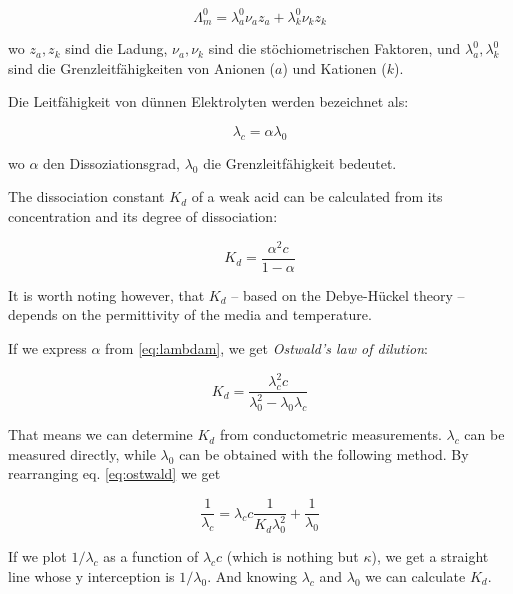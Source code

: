 
\begin{equation}
\label{eq:kohlrausch2}
	\Lambda _m^0
	=
	\lambda _a^0 \nu _a z_a + \lambda _k^0 \nu _k z_k
\end{equation}

wo $z_a, z_k$ sind die Ladung, $\nu _a, \nu _k$ sind die stöchiometrischen Faktoren, und $\lambda _a^0, \lambda _k^0$ sind die Grenzleitfähigkeiten von Anionen ($a$) und Kationen ($k$).

Die Leitfähigkeit von dünnen Elektrolyten werden bezeichnet als:

\begin{equation}
\label{eq:lambdam}
        \lambda_c
        =
        \alpha
	\lambda_0
\end{equation}

wo $\alpha$ den Dissoziationsgrad, $\lambda _0$ die Grenzleitfähigkeit bedeutet.

The dissociation constant $K_d$ of a weak acid can be calculated from its concentration and its degree of dissociation:

\begin{equation}
\label{eq:kd}
        K_d
        =
        \frac{\alpha^2 c}{1-\alpha}
\end{equation}

It is worth noting however, that $K_d$ -- based on the Debye-Hückel theory -- depends on the permittivity of the media and temperature.

If we express $\alpha$ from \ref{eq:lambdam}, we get \emph{Ostwald's law of dilution}:

\begin{equation}
\label{eq:ostwald}
        K_d
        =
        \frac{\lambda_c^2 c}{\lambda_0^2 - \lambda_0\lambda_c}
\end{equation}

That means we can determine $K_d$ from conductometric measurements. $\lambda_c$ can be measured directly, while $\lambda_0$ can be obtained with the following method. By rearranging eq. \ref{eq:ostwald} we get

\begin{equation}
\label{eq:ostwald2}
        \frac{1}{\lambda_c}
        =
	\lambda_c
	c
	\frac{1}{K_d \lambda_0^2}
	+\frac{1}{\lambda_0}
\end{equation}

If we plot $1/\lambda_c$ as a function of $\lambda_c c$ (which is nothing but $\kappa$), we get a straight line whose y interception is $1/\lambda_0$. And knowing $\lambda_c$ and $\lambda_0$ we can calculate $K_d$.

